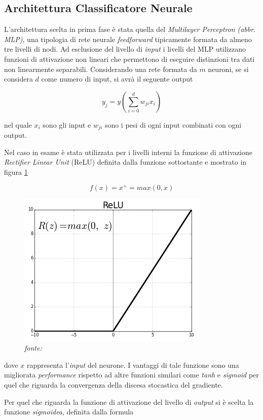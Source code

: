\subsection{Architettura Classificatore Neurale}
\label{classificatorenninterno}
L'architettura scelta in prima fase è stata quella del \textit{Multilayer Perceptron} \textit{(abbr. MLP)}, una tipologia di rete neurale \textit{feedforward} tipicamente formata da almeno tre livelli di nodi. Ad esclusione del livello di \textit{input} i livelli del MLP utilizzano  funzioni di attivazione non lineari che permettono di eseguire distinzioni tra dati non linearmente separabili. Considerando una rete formata da $m$ neuroni,  se si considera $d$ come numero di input, si avrà il seguente output

\[y_j=y\left( \sum_{i=0}^d w_{ji}x_i \right)\]


nel quale $x_i$ sono gli input e $w_{ji}$ sono i pesi di ogni input combinati con ogni output. 

Nel caso in esame è stata utilizzata per i livelli interni la funzione di attivazione \textit{Rectifier Linear Unit} (ReLU) \cite{relu} definita dalla funzione sottostante e mostrato in figura \ref{fig:relu}

\[f(x) = x^+ = max(0,x)\]

\begin{figure}[htb]
    \centering
    \includegraphics[width=0.5\columnwidth]{figures/relu.png}
    \caption{\textit{fonte:} \cite{relufig}}
\label{fig:relu}
\end{figure}

dove $x$ rappresenta l'\textit{input} del neurone. 
I vantaggi di tale funzione sono una migliorata \textit{performance} rispetto ad altre funzioni similari come \textit{tanh} e \textit{sigmoid} per quel che riguarda la convergenza della discesa stocastica del gradiente. 

Per quel che riguarda la funzione di attivazione del livello di \textit{output} si è scelta la funzione \textit{sigmoidea}, definita dalla formula 

